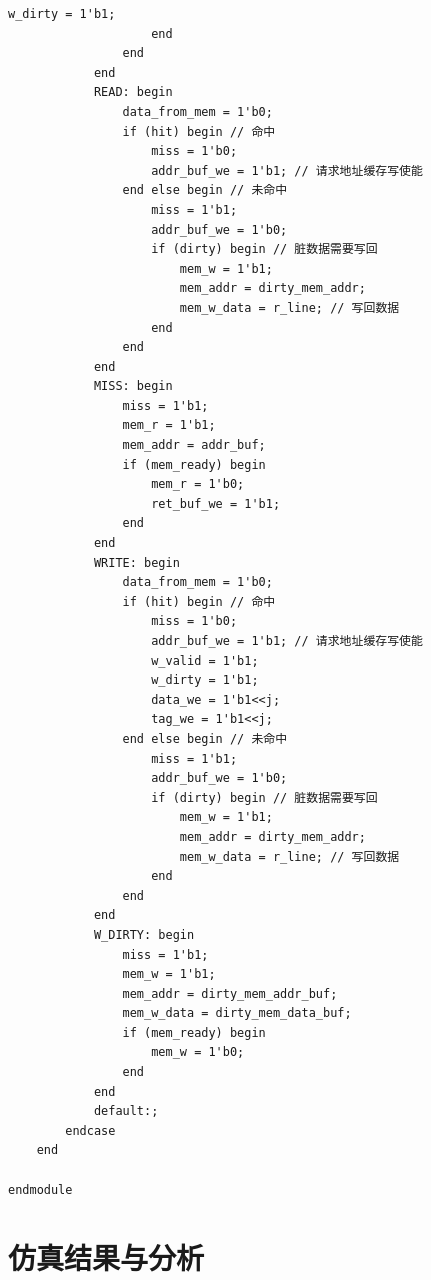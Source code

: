 \documentclass[12pt,a4paper]{ctexart}
\begin{document}
\begin{lstlisting}[style=verilog]
                        w_dirty = 1'b1;
                    end 
                end
            end
            READ: begin
                data_from_mem = 1'b0;
                if (hit) begin // 命中
                    miss = 1'b0;
                    addr_buf_we = 1'b1; // 请求地址缓存写使能
                end else begin // 未命中
                    miss = 1'b1;
                    addr_buf_we = 1'b0; 
                    if (dirty) begin // 脏数据需要写回
                        mem_w = 1'b1;
                        mem_addr = dirty_mem_addr;
                        mem_w_data = r_line; // 写回数据
                    end
                end
            end
            MISS: begin
                miss = 1'b1;
                mem_r = 1'b1;
                mem_addr = addr_buf;
                if (mem_ready) begin
                    mem_r = 1'b0;
                    ret_buf_we = 1'b1;
                end 
            end 
            WRITE: begin
                data_from_mem = 1'b0;
                if (hit) begin // 命中
                    miss = 1'b0;
                    addr_buf_we = 1'b1; // 请求地址缓存写使能
                    w_valid = 1'b1;
                    w_dirty = 1'b1;
                    data_we = 1'b1<<j;
                    tag_we = 1'b1<<j;
                end else begin // 未命中
                    miss = 1'b1;
                    addr_buf_we = 1'b0; 
                    if (dirty) begin // 脏数据需要写回
                        mem_w = 1'b1;
                        mem_addr = dirty_mem_addr;
                        mem_w_data = r_line; // 写回数据
                    end
                end
            end
            W_DIRTY: begin
                miss = 1'b1;
                mem_w = 1'b1;
                mem_addr = dirty_mem_addr_buf;
                mem_w_data = dirty_mem_data_buf;
                if (mem_ready) begin
                    mem_w = 1'b0;
                end
            end
            default:;
        endcase
    end

endmodule
\end{lstlisting}
\section{仿真结果与分析}
\end{document}
